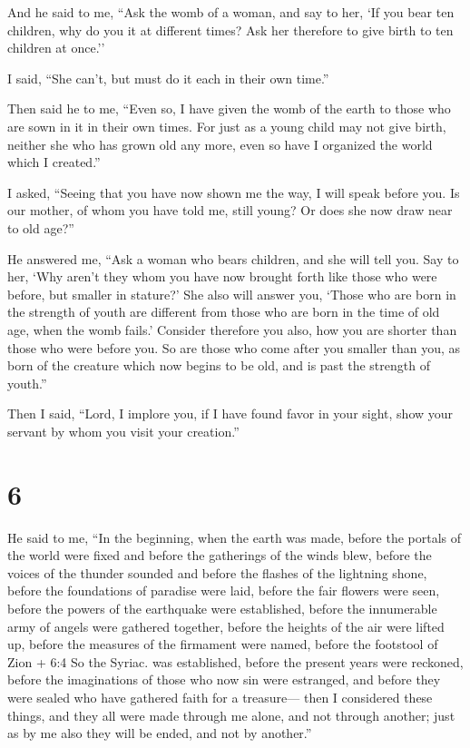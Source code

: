  And he said to me, ``Ask the womb of a woman, and say to
her, `If you bear ten children, why do you it at different times? Ask
her therefore to give birth to ten children at once.''

 I said, ``She can't, but must do it each in their own
time.''

 Then said he to me, ``Even so, I have given the womb of
the earth to those who are sown in it in their own times. 
For just as a young child may not give birth, neither she who has grown
old any more, even so have I organized the world which I created.''

 I asked, ``Seeing that you have now shown me the way, I
will speak before you. Is our mother, of whom you have told me, still
young? Or does she now draw near to old age?''

 He answered me, ``Ask a woman who bears children, and she
will tell you.  Say to her, `Why aren't they whom you have
now brought forth like those who were before, but smaller in stature?'
 She also will answer you, `Those who are born in the
strength of youth are different from those who are born in the time of
old age, when the womb fails.'  Consider therefore you
also, how you are shorter than those who were before you. 
So are those who come after you smaller than you, as born of the
creature which now begins to be old, and is past the strength of
youth.''

 Then I said, ``Lord, I implore you, if I have found favor
in your sight, show your servant by whom you visit your creation.''

\hypertarget{section-5}{%
\section{6}\label{section-5}}

 He said to me, ``In the beginning, when the earth was made,
before the portals of the world were fixed and before the gatherings of
the winds blew,  before the voices of the thunder sounded
and before the flashes of the lightning shone, before the foundations of
paradise were laid,  before the fair flowers were seen,
before the powers of the earthquake were established, before the
innumerable army of angels were gathered together,  before
the heights of the air were lifted up, before the measures of the
firmament were named, before the footstool of Zion + 6:4 So the Syriac.
was established,  before the present years were reckoned,
before the imaginations of those who now sin were estranged, and before
they were sealed who have gathered faith for a treasure--- 
then I considered these things, and they all were made through me alone,
and not through another; just as by me also they will be ended, and not
by another.''

